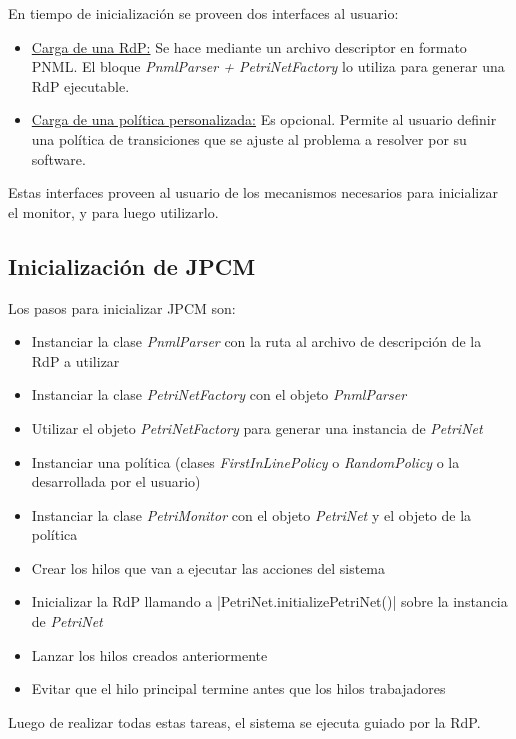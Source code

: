 En tiempo de inicialización se proveen dos interfaces al usuario:
\begin{itemize} 
  \item \underline{Carga de una RdP:} Se hace mediante un archivo descriptor
  en formato PNML. El bloque \textit{PnmlParser + PetriNetFactory} lo utiliza
  para generar una RdP ejecutable.
  \item \underline{Carga de una política personalizada:} Es opcional. Permite
  al usuario definir una política de transiciones que se ajuste al problema a
  resolver por su software.
\end{itemize}

Estas interfaces proveen al usuario de los mecanismos necesarios para
inicializar el monitor, y para luego utilizarlo.

\subsection{Inicialización de JPCM}
Los pasos para inicializar JPCM son:
\begin{itemize}
  \item Instanciar la clase \textit{PnmlParser} con la ruta al archivo de
  descripción de la RdP a utilizar
  \item Instanciar la clase \textit{PetriNetFactory} con el objeto
  \textit{PnmlParser}
  \item Utilizar el objeto \textit{PetriNetFactory} para generar una instancia
  de \textit{PetriNet}
  \item Instanciar una política (clases \textit{FirstInLinePolicy} o
  \textit{RandomPolicy} o la desarrollada por el usuario)
  \item Instanciar la clase \textit{PetriMonitor} con el objeto
  \textit{PetriNet} y el objeto de la política
  \item Crear los hilos que van a ejecutar las acciones del sistema
  \item Inicializar la RdP llamando a |PetriNet.initializePetriNet()|
  sobre la instancia de \textit{PetriNet}
  \item Lanzar los hilos creados anteriormente
  \item Evitar que el hilo principal termine antes que los hilos trabajadores
\end{itemize}
 
Luego de realizar todas estas tareas, el sistema se ejecuta guiado por la RdP.

